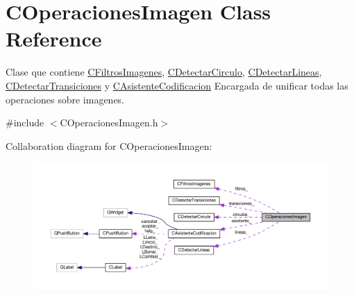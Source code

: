 \hypertarget{classCOperacionesImagen}{}\section{C\+Operaciones\+Imagen Class Reference}
\label{classCOperacionesImagen}


Clase que contiene \hyperlink{classCFiltrosImagenes}{C\+Filtros\+Imagenes}, \hyperlink{classCDetectarCirculo}{C\+Detectar\+Circulo}, \hyperlink{classCDetectarLineas}{C\+Detectar\+Lineas}, \hyperlink{classCDetectarTransiciones}{C\+Detectar\+Transiciones} y \hyperlink{classCAsistenteCodificacion}{C\+Asistente\+Codificacion} Encargada de unificar todas las operaciones sobre imagenes.  




{\ttfamily \#include $<$C\+Operaciones\+Imagen.\+h$>$}



Collaboration diagram for C\+Operaciones\+Imagen\+:
\nopagebreak
\begin{figure}[H]
\begin{center}
\leavevmode
\includegraphics[width=350pt]{classCOperacionesImagen__coll__graph}
\end{center}
\end{figure}
